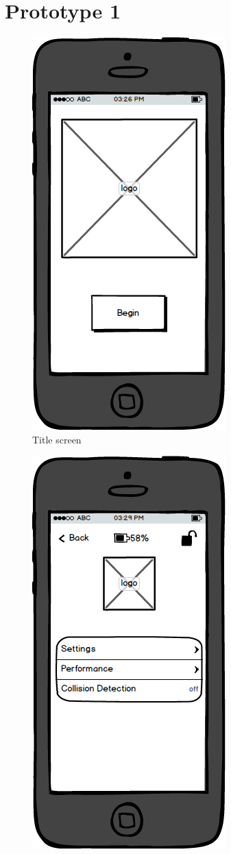 \documentclass[a4paper]{report}
\begin{document}
{\chapter{Prototype 1}
\begin{figure}
\centering
\includegraphics[scale=0.9]{figures/prototype_1/title}
\caption{Title screen}
\end{figure}
\clearpage
\begin{figure}
\centering
\includegraphics[scale=0.9]{figures/prototype_1/main_menu}

\end{figure}}
\end{document}
